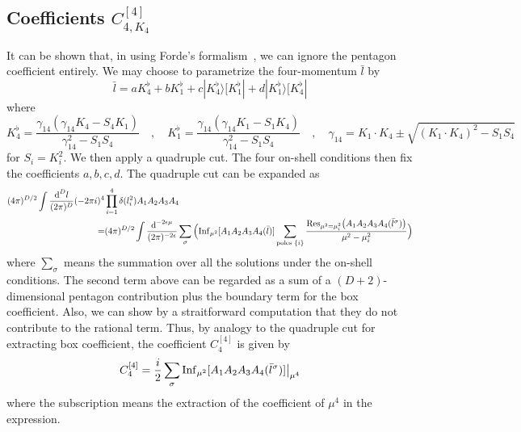 \subsection{Coefficients $C_{4, K_4}^{[4]}$}
It can be shown that, in using Forde's formalism~\cite{Forde:2007mi}, we can ignore the pentagon coefficient entirely.
We may choose to parametrize the four-momentum $\bar{l}$ by
\begin{equation*}
\bar{l} = a K_4^\flat + bK_1^\flat + c|K_4^\flat\rangle [K_1^\flat| + d|K_1^\flat\rangle[K_4^\flat|
\end{equation*}
where
\begin{equation}\label{param_rat_box}
K_4^\flat = \frac{\gamma_{14}(\gamma_{14}K_4 - S_4K_1)}{\gamma_{14}^2 - S_1S_4}
\quad,\quad
K_1^\flat = \frac{\gamma_{14}(\gamma_{14}K_1 - S_1K_4)}{\gamma_{14}^2 - S_1S_4}
\quad,\quad
\gamma_{14} = K_1\cdot K_4\pm\sqrt{(K_1\cdot K_4)^2 - S_1 S_4}
\end{equation}
for $S_i = K_i^2$.
We then apply a quadruple cut.
The four on-shell conditions then fix the coefficients $a,b,c,d$.
The quadruple cut can be expanded as
\begin{equation*}
\begin{split}
(4\pi)^{D/2}\int\frac{\textrm{d}^D l}{(2\pi)^D}(-2\pi i)^4 & \prod^4_{i=1}\delta(l_i^2)A_1A_2A_3A_4
\\
= & (4\pi)^{D/2}\int\frac{\textrm{d}^{-2\epsilon \mu}}{(2\pi)^{-2\epsilon}}
\sum_{\sigma}\Big(\mathrm{Inf}_{\mu^2}[A_1 A_2 A_3 A_4(\bar{l})] 
\sum_{\textrm{poles $\{i\}$}}\frac{\mathrm{Res}_{\mu^2 = \mu_i^2}\big(A_1A_2A_3A_4(\bar{l}^\sigma)\big)}{\mu^2 - \mu_i^2}\Big)
\end{split}
\end{equation*}
where $\sum_\sigma$ means the summation over all the solutions under the on-shell conditions. 
The second term above can be regarded as a sum of a $(D + 2)$-dimensional pentagon contribution plus the boundary term for the box coefficient.
Also, we can show by a straitforward computation that they do not contribute to the rational term. 
Thus, by analogy to the quadruple cut for extracting box coefficient, the coefficient $C_4^{[4]}$ is given by
\begin{equation*}
C_4^{[4]} = \frac{i}{2}\sum_{\sigma}\mathrm{Inf}_{\mu^2}[A_1A_2A_3A_4(\bar{l}^\sigma)]\big|_{\mu^4}
\end{equation*}
where the subscription means the extraction of the coefficient of $\mu^4$ in the expression.
%
%

